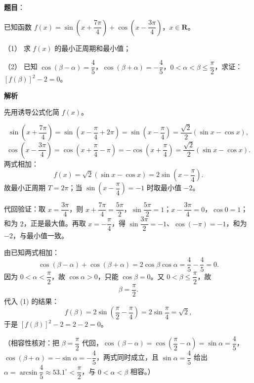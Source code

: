 \begin{answer}

\textbf{题目}：

已知函数 $f(x)=\sin\left(x+\dfrac{7\pi}{4}\right)+\cos\left(x-\dfrac{3\pi}{4}\right)$，$x\in\mathbf R$。

（1） 求 $f(x)$ 的最小正周期和最小值；

（2） 已知 $\cos(\beta-\alpha)=\dfrac45$，$\cos(\beta+\alpha)=-\dfrac45$，$0<\alpha<\beta\leqslant\dfrac{\pi}{2}$，求证：$[f(\beta)]^2-2=0$。

\textbf{解析}

先用诱导公式化简 $f(x)$。


\nopagebreak[4]
\[
\sin\left(x+\frac{7\pi}{4}\right)=\sin\left(x-\frac{\pi}{4}+2\pi\right)=\sin\left(x-\frac{\pi}{4}\right)=\frac{\sqrt2}{2}(\sin x-\cos x),
\]
\nopagebreak[4]
\[
\cos\left(x-\frac{3\pi}{4}\right)=\cos\left(x+\frac{\pi}{4}-\pi\right)=-\cos\left(x+\frac{\pi}{4}\right)=\frac{\sqrt2}{2}(\sin x-\cos x).
\]
两式相加：
\nopagebreak[4]
\[
f(x)=\sqrt2(\sin x-\cos x)=2\sin\left(x-\frac{\pi}{4}\right).
\]
故最小正周期 $T=2\pi$；当 $\sin\left(x-\dfrac{\pi}{4}\right)=-1$ 时取最小值 $-2$。

代回验证：取 $x=\dfrac{3\pi}{4}$，则 $x+\dfrac{7\pi}{4}=\dfrac{5\pi}{2}$，$\sin\dfrac{5\pi}{2}=1$；$x-\dfrac{3\pi}{4}=0$，$\cos 0=1$；和为 $2$，正是最大值。再取 $x=-\dfrac{\pi}{4}$，得 $\sin\dfrac{3\pi}{2}=-1$、$\cos(-\pi)=-1$，和为 $-2$，与最小值一致。


由已知两式相加：
\nopagebreak[4]
\[
\cos(\beta-\alpha)+\cos(\beta+\alpha)=2\cos\beta\cos\alpha=\frac45-\frac45=0.
\]
因为 $0<\alpha<\dfrac{\pi}{2}$，故 $\cos\alpha>0$，只能 $\cos\beta=0$。又 $0<\beta\leqslant\dfrac{\pi}{2}$，故
\nopagebreak[4]
\[
\beta=\frac{\pi}{2}.
\]
代入 (1) 的结果：
\nopagebreak[4]
\[
f(\beta)=2\sin\left(\frac{\pi}{2}-\frac{\pi}{4}\right)=2\sin\frac{\pi}{4}=\sqrt2,
\]
于是 $[f(\beta)]^2-2=2-2=0$。

（相容性核对：把 $\beta=\dfrac{\pi}{2}$ 代回，$\cos(\beta-\alpha)=\cos\left(\dfrac{\pi}{2}-\alpha\right)=\sin\alpha=\dfrac45$，$\cos(\beta+\alpha)=-\sin\alpha=-\dfrac45$，两式同时成立，且 $\sin\alpha=\dfrac45$ 给出 $\alpha=\arcsin\dfrac45\approx53.1^\circ<\dfrac{\pi}{2}$，与 $0<\alpha<\beta$ 相容。）



\end{answer}
